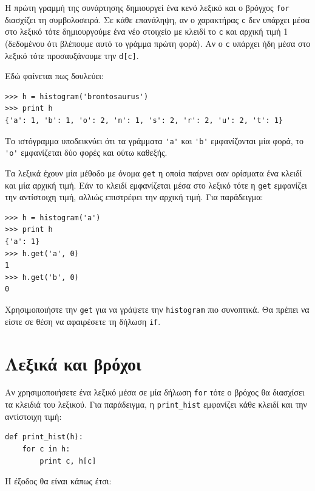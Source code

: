 \documentclass[10pt]{book}
\begin{document}
Η πρώτη γραμμή της συνάρτησης δημιουργεί ένα κενό λεξικό και ο βρόγχος {\tt for} διασχίζει τη συμβολοσειρά. Σε κάθε επανάληψη, αν ο χαρακτήρας {\tt c} δεν υπάρχει μέσα στο λεξικό τότε δημιουργούμε ένα νέο στοιχείο με κλειδί το {\tt c} και αρχική τιμή 1 (δεδομένου ότι βλέπουμε αυτό το γράμμα πρώτη φορά). Αν ο  {\tt c} υπάρχει ήδη μέσα στο λεξικό τότε προσαυξάνουμε την {\tt d[c]}.

Εδώ φαίνεται πως δουλεύει:

\begin{verbatim}
>>> h = histogram('brontosaurus')
>>> print h
{'a': 1, 'b': 1, 'o': 2, 'n': 1, 's': 2, 'r': 2, 'u': 2, 't': 1}
\end{verbatim}
%
Το ιστόγραμμα υποδεικνύει ότι τα γράμματα \verb"'a'" και \verb"'b'" εμφανίζονται μία φορά, το \verb"'o'" εμφανίζεται δύο φορές και ούτω καθεξής.
\\
\begin{exercise}

Τα λεξικά έχουν μία μέθοδο με όνομα {\tt get} η οποία παίρνει σαν ορίσματα ένα κλειδί και μία αρχική τιμή. Εάν το κλειδί εμφανίζεται μέσα στο λεξικό τότε η  {\tt get} εμφανίζει την αντίστοιχη τιμή, αλλιώς επιστρέφει την αρχική τιμή. Για παράδειγμα:

\begin{verbatim}
>>> h = histogram('a')
>>> print h
{'a': 1}
>>> h.get('a', 0)
1
>>> h.get('b', 0)
0
\end{verbatim}
%
 
Χρησιμοποιήστε την {\tt get} για να γράψετε την {\tt histogram} πιο συνοπτικά. Θα πρέπει να είστε σε θέση να αφαιρέσετε τη δήλωση {\tt if}.
\end{exercise}


\section{Λεξικά και βρόχοι}

Αν χρησιμοποιήσετε ένα λεξικό μέσα σε μία δήλωση {\tt for} τότε ο βρόχος θα διασχίσει τα κλειδιά του λεξικού. Για παράδειγμα, η  \verb"print_hist"  εμφανίζει κάθε κλειδί και την αντίστοιχη τιμή:

\begin{verbatim}
def print_hist(h):
    for c in h:
        print c, h[c]
\end{verbatim}
%
Η έξοδος θα είναι κάπως έτσι:
\end{document}
